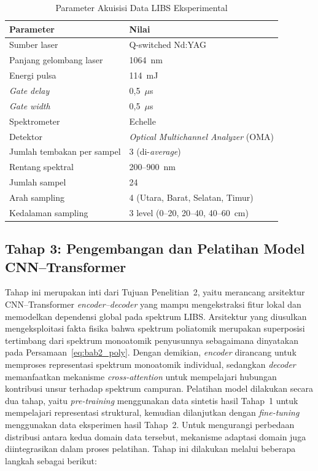\begin{table}[htbp]
  \centering
  \caption{Parameter Akuisisi Data LIBS Eksperimental}
  \label{tab:param_eksperimen}
  \small
  \begin{tabularx}{\textwidth}{|l|X|}
    \hline
    \textbf{Parameter} & \textbf{Nilai} \\
    \hline
    Sumber laser & Q-switched Nd:YAG \\
    \hline
    Panjang gelombang laser & 1064~nm \\
    \hline
    Energi pulsa & 114~mJ \\
    \hline
    \textit{Gate delay} & 0,5~$\mu$s \\
    \hline
    \textit{Gate width} & 0,5~$\mu$s \\
    \hline
    Spektrometer & Echelle \\
    \hline
    Detektor & \textit{Optical Multichannel Analyzer} (OMA) \\
    \hline
    Jumlah tembakan per sampel & 3 (di-\textit{average}) \\
    \hline
    Rentang spektral & 200--900~nm \\
    \hline
    Jumlah sampel & 24 \\
    \hline
    Arah sampling & 4 (Utara, Barat, Selatan, Timur) \\
    \hline
    Kedalaman sampling & 3 level (0--20, 20--40, 40--60~cm) \\
    \hline
  \end{tabularx}
\end{table}

\subsection{Tahap 3: Pengembangan dan Pelatihan Model CNN--Transformer}

Tahap ini merupakan inti dari Tujuan Penelitian~2, yaitu merancang arsitektur CNN--Transformer \textit{encoder--decoder} yang mampu mengekstraksi fitur lokal dan memodelkan dependensi global pada spektrum LIBS. Arsitektur yang diusulkan mengeksploitasi fakta fisika bahwa spektrum poliatomik merupakan superposisi tertimbang dari spektrum monoatomik penyusunnya sebagaimana dinyatakan pada Persamaan~\ref{eq:bab2_poly}. Dengan demikian, \textit{encoder} dirancang untuk memproses representasi spektrum monoatomik individual, sedangkan \textit{decoder} memanfaatkan mekanisme \textit{cross-attention} untuk mempelajari hubungan kontribusi unsur terhadap spektrum campuran. Pelatihan model dilakukan secara dua tahap, yaitu \textit{pre-training} menggunakan data sintetis hasil Tahap~1 untuk mempelajari representasi struktural, kemudian dilanjutkan dengan \textit{fine-tuning} menggunakan data eksperimen hasil Tahap~2. Untuk mengurangi perbedaan distribusi antara kedua domain data tersebut, mekanisme adaptasi domain juga diintegrasikan dalam proses pelatihan. Tahap ini dilakukan melalui beberapa langkah sebagai berikut:

